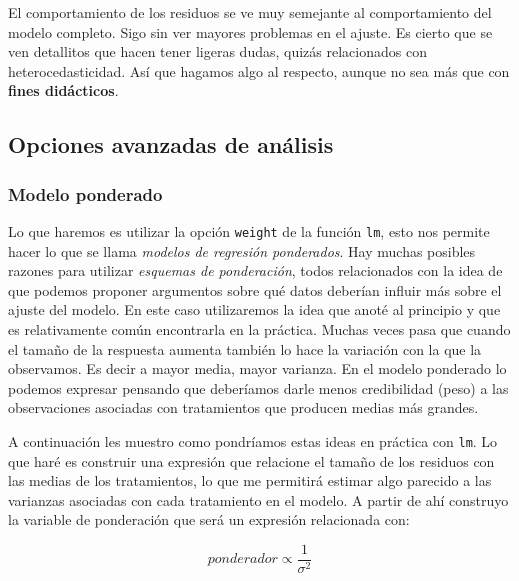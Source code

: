 \documentclass[
  letterpaper,
  DIV=11,
  numbers=noendperiod]{scrartcl}
\begin{document}
El comportamiento de los residuos se ve muy semejante al comportamiento
del modelo completo. Sigo sin ver mayores problemas en el ajuste. Es
cierto que se ven detallitos que hacen tener ligeras dudas, quizás
relacionados con heterocedasticidad. Así que hagamos algo al respecto,
aunque no sea más que con \textbf{fines didácticos}.

\subsection{Opciones avanzadas de
análisis}\label{opciones-avanzadas-de-anuxe1lisis}

\subsubsection{Modelo ponderado}\label{modelo-ponderado}

Lo que haremos es utilizar la opción \texttt{weight} de la función
\texttt{lm}, esto nos permite hacer lo que se llama \emph{modelos de
regresión ponderados}. Hay muchas posibles razones para utilizar
\emph{esquemas de ponderación}, todos relacionados con la idea de que
podemos proponer argumentos sobre qué datos deberían influir más sobre
el ajuste del modelo. En este caso utilizaremos la idea que anoté al
principio y que es relativamente común encontrarla en la práctica.
Muchas veces pasa que cuando el tamaño de la respuesta aumenta también
lo hace la variación con la que la observamos. Es decir a mayor media,
mayor varianza. En el modelo ponderado lo podemos expresar pensando que
deberíamos darle menos credibilidad (peso) a las observaciones asociadas
con tratamientos que producen medias más grandes.

A continuación les muestro como pondríamos estas ideas en práctica con
\texttt{lm}. Lo que haré es construir una expresión que relacione el
tamaño de los residuos con las medias de los tratamientos, lo que me
permitirá estimar algo parecido a las varianzas asociadas con cada
tratamiento en el modelo. A partir de ahí construyo la variable de
ponderación que será un expresión relacionada con:

\[
  ponderador \propto  \frac{1}{\sigma ^2}
\]
\end{document}
